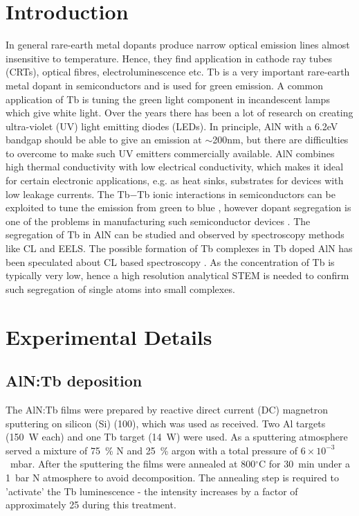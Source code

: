 \documentclass[%
aip,
rsi,%
 amsmath,amssymb,%
 reprint,%
]{revtex4-1}
\begin{document}
\section{Introduction}
\label{sec:Intro}

In general rare-earth metal dopants\cite{Kenyon2003,Kenyon2002} produce narrow optical emission lines almost insensitive to temperature. Hence, they find application in cathode ray tubes (CRTs), optical fibres, electroluminescence etc\cite{Aitasalo2003}. Tb is a very important rare-earth metal dopant in semiconductors and is used for green emission. A common application of Tb is tuning the green light component in incandescent lamps which give white light. Over the years there has been a lot of research on creating ultra-violet (UV) light emitting diodes (LEDs). In principle, AlN with a 6.2eV bandgap should be able to give an emission at $\sim$200nm, but there are difficulties to overcome to make such UV emitters commercially available. AlN combines high thermal conductivity with low electrical conductivity, which makes it ideal for certain electronic applications, e.g. as heat sinks, substrates for devices with low leakage currents. The Tb$-$Tb ionic interactions in semiconductors can be exploited to tune the emission from green to blue \cite{Benz2013}, however dopant segregation is one of the problems in manufacturing such semiconductor devices \cite{Keizer2015}. The segregation of Tb in AlN can be studied and observed by spectroscopy methods like CL and EELS. The possible formation of Tb complexes in Tb doped AlN has been speculated about CL based spectroscopy \cite{Benz2013_AlNTb}. As the concentration of Tb is typically very low, hence a high resolution analytical STEM is needed to confirm such segregation of single atoms into small complexes.
\section{Experimental Details}
\label{sec:exp_detail}
\subsection{AlN:Tb deposition}
\label{sec:growth}
The AlN:Tb films were prepared by reactive direct current (DC) magnetron sputtering on silicon (Si) (100), which was used as received. Two Al targets (150~W each) and one Tb target (14~W) were used. As a sputtering atmosphere served a mixture of 75~\% N and 25~\% argon with a total pressure of $6 \times 10^{-3}$~mbar. After the sputtering the films were annealed at 800$^\circ$C for 30~min under a 1~bar N atmosphere to avoid decomposition. The annealing step is required to 'activate' the Tb luminescence - the intensity increases by a factor of approximately 25 during this treatment.
\end{document}
